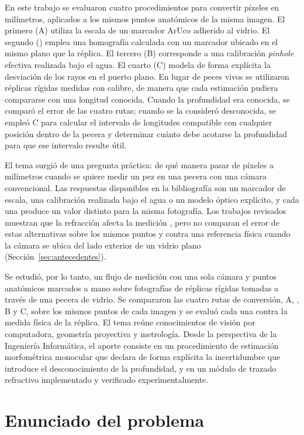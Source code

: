 En este trabajo se evaluaron cuatro procedimientos para convertir píxeles en milímetros, aplicados a los mismos puntos anatómicos de la misma imagen. El primero (A) utiliza la escala de un marcador ArUco adherido al vidrio. El segundo (\Aprime) emplea una homografía calculada con un marcador ubicado en el mismo plano que la réplica. El tercero (B) corresponde a una calibración \emph{pinhole} efectiva realizada bajo el agua. El cuarto (C) modela de forma explícita la desviación de los rayos en el puerto plano. En lugar de peces vivos se utilizaron réplicas rígidas medidas con calibre, de manera que cada estimación pudiera compararse con una longitud conocida. Cuando la profundidad era conocida, se comparó el error de las cuatro rutas; cuando se la consideró desconocida, se empleó C para calcular el intervalo de longitudes compatible con cualquier posición dentro de la pecera y determinar cuánto debe acotarse la profundidad para que ese intervalo resulte útil.



El tema surgió de una pregunta práctica: de qué manera pasar de píxeles a milímetros cuando se quiere medir un pez en una pecera con una cámara convencional. Las respuestas disponibles en la bibliografía son un marcador de escala, una calibración realizada bajo el agua o un modelo óptico explícito, y cada una produce un valor distinto para la misma fotografía. Los trabajos revisados muestran que la refracción afecta la medición \parencite{Agrawal2012,Rofallski2022,Treibitz2012}, pero no comparan el error de estas alternativas sobre los mismos puntos y contra una referencia física cuando la cámara se ubica del lado exterior de un vidrio plano (Sección~\ref{sec:antecedentes}).

Se estudió, por lo tanto, un flujo de medición con una sola cámara y puntos anatómicos marcados a mano sobre fotografías de réplicas rígidas tomadas a través de una pecera de vidrio. Se compararon las cuatro rutas de conversión, A, \Aprime, B y C, sobre los mismos puntos de cada imagen y se evaluó cada una contra la medida física de la réplica. El tema reúne conocimientos de visión por computadora, geometría proyectiva y metrología. Desde la perspectiva de la Ingeniería Informática, el aporte consiste en un procedimiento de estimación morfométrica monocular que declara de forma explícita la incertidumbre que introduce el desconocimiento de la profundidad, y en un módulo de trazado refractivo implementado y verificado experimentalmente.

\section{Enunciado del problema}
\label{sec:enunciado}

